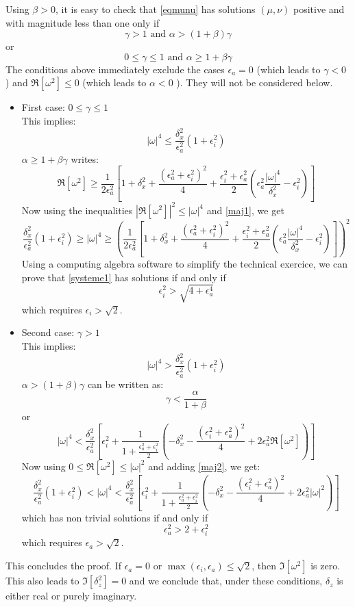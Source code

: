 Using $\beta > 0$, it is easy to check that \ref{eqmunu} has solutions $(\mu,\nu)$ positive and with magnitude less than one only if
\[
\gamma>1 \mbox{ and }\alpha > (1 + \beta ) \gamma
\]
or
\[
0\le \gamma\le 1 \mbox{ and }\alpha \ge 1 + \beta \gamma
\]
The conditions above immediately exclude the cases $\epsilon_a=0$ (which leads to $\gamma < 0$ ) and $\Re[\omega^2] \le 0$ (which leads to $\alpha <  0$ ). They will not be considered below.
\begin{itemize}
	\item First case: $0\le \gamma \le 1$\\
	This implies:
	\begin{equation}
	|\omega|^4 \le \frac{\delta_x^2}{\epsilon_a^2}(1+\epsilon_i^2)
	\label{maj1}
	\end{equation}
	$\alpha \ge 1 + \beta \gamma$ writes:
	\[
	\Re[\omega^2] \ge  \frac{1}{2\epsilon_a^2}\left[
	1+\delta_x^2+\frac{(\epsilon_a^2+\epsilon_i^2)^2}{4}
	+\frac{\epsilon_i^2+\epsilon_a^2}{2}\left(
	\epsilon_a^2\frac{|\omega|^4}{\delta_x^2} -\epsilon_i^2
	\right)
	\right]
	\]
	Now using the inequalities $|\Re[\omega^2]|^2 \le |\omega|^4$ and \ref{maj1}, we get
	\begin{equation}
	\frac{\delta_x^2}{\epsilon_a^2}(1+\epsilon_i^2)
	\ge
	|\omega|^4
	\ge 
	\left(
	\frac{1}{2\epsilon_a^2}\left[
	1+\delta_x^2+\frac{(\epsilon_a^2+\epsilon_i^2)^2}{4}
	+\frac{\epsilon_i^2+\epsilon_a^2}{2}\left(
	\epsilon_a^2\frac{|\omega|^4}{\delta_x^2} -\epsilon_i^2
	\right)
	\right]
	\right)^2
	\label{systeme1}
	\end{equation}
	Using a computing algebra software to simplify the technical exercice, we can prove that \ref{systeme1} has solutions if and only if
	\[
	\epsilon_i^2 > \sqrt{4+\epsilon_a^4}
	\]
	which requires $\epsilon_i > \sqrt{2}$.
	\item Second case: $\gamma > 1$\\
	This implies:
	\begin{equation}
	|\omega|^4 > \frac{\delta_x^2}{\epsilon_a^2}(1+\epsilon_i^2)
	\label{maj2}
	\end{equation}
	$\alpha > (1 + \beta ) \gamma$ can be written as:
	\[
	\gamma < \frac{\alpha}{1+\beta}
	\]
	or
	\[
	|\omega|^4 < \frac{\delta_x^2}{\epsilon_a^2}\left[
	\epsilon_i^2
	+\frac{1}{1+\frac{\epsilon_a^2+\epsilon_i^2}{2}}
	\left(
	-\delta_x^2-\frac{(\epsilon_i^2+\epsilon_a^2)^2}{4}+2\epsilon_a^2\Re[\omega^2]
	\right)
	\right]
	\]
	Now using $0 \le \Re[\omega^2] \le |\omega|^2$ and adding \ref{maj2}, we get:
	\[
	\frac{\delta_x^2}{\epsilon_a^2}(1+\epsilon_i^2)
	<
	|\omega|^4 < \frac{\delta_x^2}{\epsilon_a^2}\left[
	\epsilon_i^2
	+\frac{1}{1+\frac{\epsilon_a^2+\epsilon_i^2}{2}}
	\left(
	-\delta_x^2-\frac{(\epsilon_i^2+\epsilon_a^2)^2}{4}+2\epsilon_a^2|\omega|^2
	\right)
	\right]
	\]
	which has non trivial solutions if and only if
	\[
	\epsilon_a^2 > 2+ \epsilon_i^2
	\]
	which requires $\epsilon_a > \sqrt{2}$.
\end{itemize}
This concludes the proof. If $\epsilon_a=0$ or $\max(\epsilon_i,\epsilon_a)\le \sqrt{2}$, then $\Im[\omega^2]$ is zero. This also leads to $\Im[\delta_z^2]=0$ and we conclude that, under these conditions, $\delta_z$ is either real or purely imaginary.
